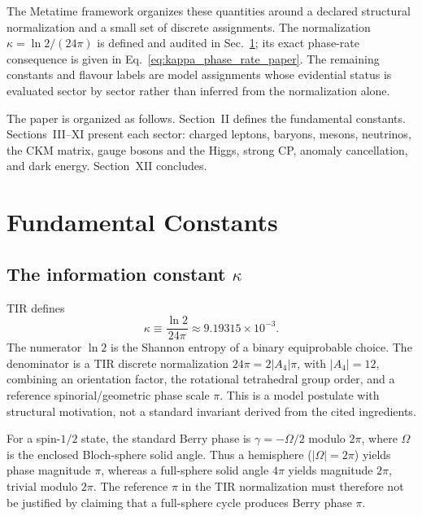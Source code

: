 \documentclass[aps,prd,reprint,twocolumn,showpacs,superscriptaddress]{revtex4-2}
\begin{document}
The Metatime framework organizes these quantities around a declared structural
normalization and a small set of discrete assignments.  The normalization
$\kappa=\ln2/(24\pi)$ is defined and audited in
Sec.~\ref{sec:constants}; its exact phase-rate consequence is given in
Eq.~\eqref{eq:kappa_phase_rate_paper}.  The remaining constants and flavour
labels are model assignments whose evidential status is evaluated sector by
sector rather than inferred from the normalization alone.

The paper is organized as follows.  Section~II defines the fundamental
constants.  Sections~III--XI present each sector: charged leptons,
baryons, mesons, neutrinos, the CKM matrix, gauge bosons and the Higgs,
strong CP, anomaly cancellation, and dark energy.  Section~XII concludes.

\section{Fundamental Constants}
\label{sec:constants}

\subsection{The information constant $\kappa$}

TIR defines
\begin{equation}
\kappa \equiv \frac{\ln 2}{24\pi}
\approx 9.19315 \times 10^{-3}.
\label{eq:oi}
\end{equation}
The numerator $\ln2$ is the Shannon entropy of a binary equiprobable choice.
The denominator is a TIR discrete normalization
$24\pi=2|A_4|\pi$, with $|A_4|=12$, combining an orientation factor, the
rotational tetrahedral group order, and a reference spinorial/geometric phase
scale $\pi$.  This is a model postulate with structural motivation, not a
standard invariant derived from the cited ingredients.

For a spin-$1/2$ state, the standard Berry phase is
$\gamma=-\Omega/2$ modulo $2\pi$, where $\Omega$ is the enclosed Bloch-sphere
solid angle.  Thus a hemisphere ($|\Omega|=2\pi$) yields phase magnitude $\pi$,
whereas a full-sphere solid angle $4\pi$ yields magnitude $2\pi$, trivial modulo
$2\pi$.  The reference $\pi$ in the TIR normalization must therefore not be
justified by claiming that a full-sphere cycle produces Berry phase $\pi$.
\end{document}
